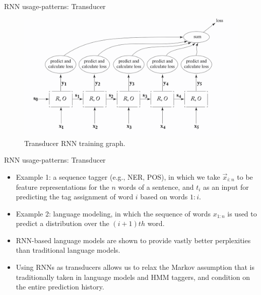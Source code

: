 \documentclass[handout]{beamer}
\begin{document}
\begin{frame}{RNN usage-patterns: Transducer}
\begin{scriptsize}
  \begin{figure}[h]
        	\includegraphics[scale = 0.25]{pics/transducer.png}
        	\caption{Transducer RNN training graph.}
        \end{figure}

\end{scriptsize}
\end{frame}



\begin{frame}{RNN usage-patterns: Transducer}
\begin{scriptsize}

\begin{itemize}

\item Example 1: a sequence tagger (e.g., NER, POS), in which we take $\vec{x}_{i:n}$ to be feature representations for the $n$ words of a sentence, and $t_i$ as an input for predicting the tag assignment of word $i$ based on words $1:i$.
\item Example 2: language modeling, in which the sequence of words $x_{1:n}$ is used to predict a distribution over the $(i+1)th$ word. 
\item RNN-based language models are shown to provide vastly better perplexities than traditional language models.

\item Using RNNs as transducers allows us to relax the Markov assumption that is traditionally taken in language models and HMM taggers, and condition on the entire prediction history.

\end{itemize}
\end{scriptsize}
\end{frame}
\end{document}
